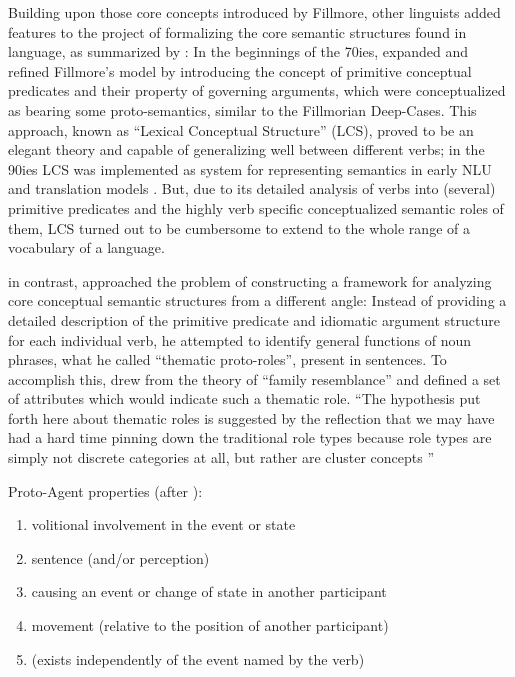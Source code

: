 Building upon those core concepts introduced by Fillmore, other linguists added features
to the project of formalizing the core semantic structures found in language, as summarized by
\citeauthor{palmer2010semantic}:
In the beginnings of the 70ies, \cite{jackendoff1972semantic} expanded and refined Fillmore's
model by introducing the concept of primitive conceptual predicates and their property of governing
arguments, which were conceptualized as bearing some proto-semantics, similar to the Fillmorian
Deep-Cases. This approach, known as ``Lexical Conceptual Structure'' (LCS), proved to be
an elegant theory and capable of generalizing well between different verbs; in the 90ies LCS
was implemented as system for representing semantics in early NLU and translation models \citep{palmer2010semantic}.
But, due to its detailed analysis of verbs into (several) primitive predicates and the highly verb specific
conceptualized semantic roles of them, LCS turned out to be cumbersome to extend to the whole range
of a vocabulary of a language.

\cite{dowty1991thematic} in contrast, approached the problem of constructing
a framework for analyzing core conceptual semantic structures from a different
angle: Instead of providing a detailed description of the primitive predicate and
idiomatic argument structure for each individual verb, he attempted to identify
general functions of noun phrases, what he called ``thematic proto-roles'',
present in sentences. To accomplish this, \citeauthor{dowty1991thematic} drew
from the theory of ``family resemblance'' and defined a set of attributes which
would indicate such a thematic role.
``The hypothesis put forth here about thematic roles is suggested by the
reflection that we may have had a hard time pinning down the traditional role
types because role types are simply not discrete categories at all, but rather
are cluster concepts \textelp{}'' \citep[p.~571]{dowty1991thematic}

Proto-Agent properties (after \citep[p.~572]{dowty1991thematic}):

\begin{enumerate}[label=\alph*]
  \item volitional involvement in the event or state
  \item sentence (and/or perception)
  \item causing an event or change of state in another participant
  \item movement (relative to the position of another participant)
  \item (exists independently of the event named by the verb)
\end{enumerate}

